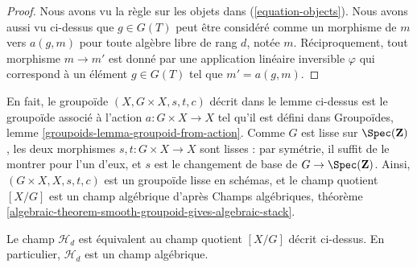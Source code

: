 \begin{proof}
Nous avons vu la règle sur les objets dans (\ref{equation-objects}).
Nous avons aussi vu ci-dessus que $g \in G(T)$ peut être considéré comme
un morphisme de $m$ vers $a(g, m)$ pour toute algèbre libre de rang $d$, notée $m$.
Réciproquement, tout morphisme $m \to m'$ est donné par une application linéaire
inversible $\varphi$ qui correspond à un élément $g \in G(T)$ tel
que $m' = a(g, m)$.
\end{proof}

\noindent
En fait, le groupoïde $(X, G \times X, s, t, c)$ décrit dans le
lemme ci-dessus est le groupoïde associé à l'action $a : G \times X \to X$
tel qu'il est défini dans
Groupoïdes, lemme \ref{groupoids-lemma-groupoid-from-action}.
Comme $G$ est lisse sur $\Spec(\mathbf{Z})$,
les deux morphismes $s, t : G \times X \to X$ sont
lisses : par symétrie, il suffit de le montrer pour l'un d'eux, et
$s$ est le changement de base de $G \to \Spec(\mathbf{Z})$.
Ainsi, $(G \times X, X, s, t, c)$ est un groupoïde lisse en schémas,
et le champ quotient $[X/G]$ est un champ algébrique d'après
Champs algébriques,
théorème \ref{algebraic-theorem-smooth-groupoid-gives-algebraic-stack}.

\begin{proposition}
\label{proposition-finite-hilbert-point}
Le champ $\mathcal{H}_d$ est équivalent au champ quotient
$[X/G]$ décrit ci-dessus. En particulier, $\mathcal{H}_d$ est un
champ algébrique.
\end{proposition}

